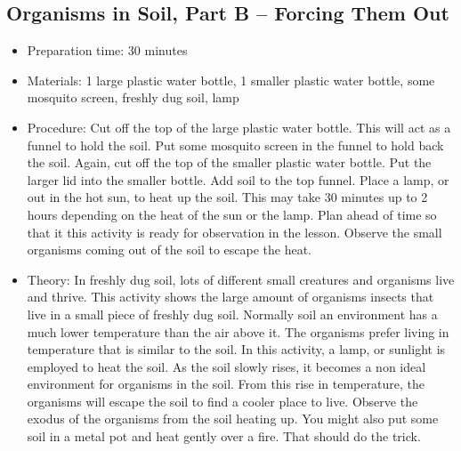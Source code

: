 \subsection{Organisms in Soil, Part B -- Forcing Them Out}
\begin{itemize}
\item{Preparation time: 30 minutes}
\item{Materials: 1 large plastic water bottle, 1 smaller plastic water bottle, some mosquito screen, freshly dug soil, lamp}
\item{Procedure: Cut off the top of the large plastic water bottle. This will act as a funnel to hold the soil. Put some mosquito screen in the funnel to hold back the soil. Again, cut off the top of the smaller plastic water bottle. Put the larger lid into the smaller bottle. Add soil to the top funnel. Place a lamp, or out in the hot sun, to heat up the soil. This may take 30 minutes up to 2 hours depending on the heat of the sun or the lamp. Plan ahead of time so that it this activity is ready for observation in the lesson. Observe the small organisms coming out of the soil to escape the heat.}
\item{Theory: In freshly dug soil, lots of different small creatures and organisms live and thrive. This activity shows the large amount of organisms insects that live in a small piece of freshly dug soil. Normally soil an environment has a much lower temperature than the air above it. The organisms prefer living in temperature that is similar to the soil. In this activity, a lamp, or sunlight is employed to heat the soil. As the soil slowly rises, it becomes a non ideal environment for organisms in the soil. From this rise in temperature, the organisms will escape the soil to find a cooler place to live. Observe the exodus of the organisms from the soil heating up. You might also put some soil in a metal pot and heat gently over a fire. That should do the trick.}
\end{itemize}

